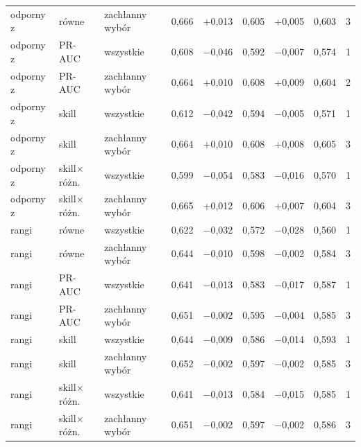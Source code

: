 \begin{tabular}{lllrrrrrr}
odporny z & równe & zachłanny wybór & 0,666 & +0,013 & 0,605 & +0,005 & 0,603 & 3 \\
odporny z & PR-AUC & wszystkie & 0,608 & $-$0,046 & 0,592 & $-$0,007 & 0,574 & 1 \\
odporny z & PR-AUC & zachłanny wybór & 0,664 & +0,010 & 0,608 & +0,009 & 0,604 & 2 \\
odporny z & skill & wszystkie & 0,612 & $-$0,042 & 0,594 & $-$0,005 & 0,571 & 1 \\
odporny z & skill & zachłanny wybór & 0,664 & +0,010 & 0,608 & +0,008 & 0,605 & 3 \\
odporny z & skill$\times$różn. & wszystkie & 0,599 & $-$0,054 & 0,583 & $-$0,016 & 0,570 & 1 \\
odporny z & skill$\times$różn. & zachłanny wybór & 0,665 & +0,012 & 0,606 & +0,007 & 0,604 & 3 \\
rangi & równe & wszystkie & 0,622 & $-$0,032 & 0,572 & $-$0,028 & 0,560 & 1 \\
rangi & równe & zachłanny wybór & 0,644 & $-$0,010 & 0,598 & $-$0,002 & 0,584 & 3 \\
rangi & PR-AUC & wszystkie & 0,641 & $-$0,013 & 0,583 & $-$0,017 & 0,587 & 1 \\
rangi & PR-AUC & zachłanny wybór & 0,651 & $-$0,002 & 0,595 & $-$0,004 & 0,585 & 3 \\
rangi & skill & wszystkie & 0,644 & $-$0,009 & 0,586 & $-$0,014 & 0,593 & 1 \\
rangi & skill & zachłanny wybór & 0,652 & $-$0,002 & 0,597 & $-$0,002 & 0,585 & 3 \\
rangi & skill$\times$różn. & wszystkie & 0,641 & $-$0,013 & 0,584 & $-$0,015 & 0,585 & 1 \\
rangi & skill$\times$różn. & zachłanny wybór & 0,651 & $-$0,002 & 0,597 & $-$0,002 & 0,586 & 3 \\
\bottomrule
\end{tabular}

